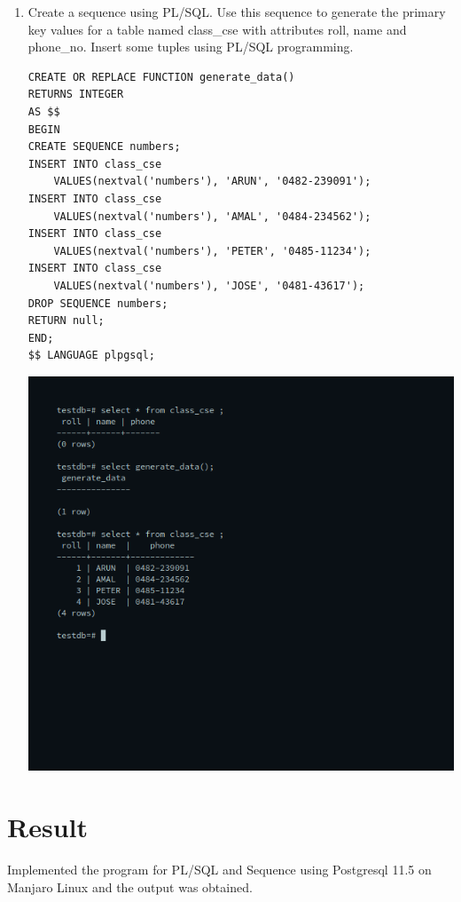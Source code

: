 \begin{enumerate}
\item Create a sequence using PL/SQL. Use this sequence to generate the primary key values for a table named class\_cse with attributes roll, name and phone\_no. Insert some tuples using PL/SQL programming.\newline
\begin{verbatim}
CREATE OR REPLACE FUNCTION generate_data()
RETURNS INTEGER
AS $$
BEGIN
CREATE SEQUENCE numbers;
INSERT INTO class_cse 
	VALUES(nextval('numbers'), 'ARUN', '0482-239091');
INSERT INTO class_cse 
	VALUES(nextval('numbers'), 'AMAL', '0484-234562');
INSERT INTO class_cse 
	VALUES(nextval('numbers'), 'PETER', '0485-11234');
INSERT INTO class_cse 
	VALUES(nextval('numbers'), 'JOSE', '0481-43617');
DROP SEQUENCE numbers;
RETURN null;
END;
$$ LANGUAGE plpgsql;
\end{verbatim}
\newline
\includegraphics[width=\linewidth]{../Images/Plsql/6.png}

\end{enumerate}

\section{Result}
Implemented the program for PL/SQL and Sequence using Postgresql 11.5 on Manjaro Linux and the output was obtained.